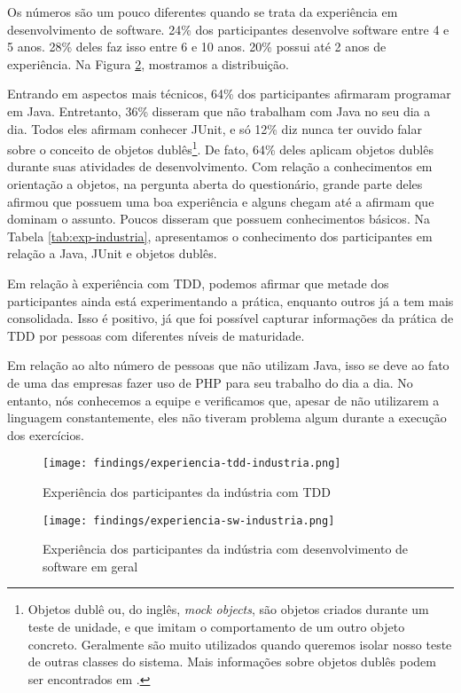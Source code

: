 Os números são um pouco diferentes quando se trata da experiência em desenvolvimento
de software. 24\% dos participantes desenvolve software entre 4 e 5 anos.
28\% deles faz isso entre 6 e 10 anos. 20\% possui até 2 anos de experiência.
Na Figura \ref{fig:exp-sw-industria}, mostramos a distribuição.

Entrando em aspectos mais técnicos, 64\% dos participantes afirmaram programar em Java. Entretanto,
36\% disseram que não trabalham com Java no seu dia a dia. Todos eles afirmam conhecer JUnit,
e só 12\% diz nunca ter ouvido falar sobre o conceito de objetos dublês\footnote{Objetos dublê ou, do inglês, 
\textit{mock objects}, são objetos criados durante um teste de unidade, e que imitam o comportamento de um
outro objeto concreto. Geralmente são muito utilizados quando queremos isolar nosso teste de outras classes
do sistema. Mais informações sobre objetos dublês podem ser encontrados em \cite{mocks}.}. De fato, 64\% deles
aplicam objetos dublês durante suas atividades de desenvolvimento. Com relação a conhecimentos
em orientação a objetos, na pergunta aberta do questionário, grande parte deles 
afirmou que possuem uma boa experiência e alguns
chegam até a afirmam que dominam o assunto. Poucos disseram que possuem conhecimentos
básicos. Na Tabela \ref{tab:exp-industria},
apresentamos o conhecimento dos participantes em relação a Java, JUnit e objetos dublês.

Em relação à experiência com TDD,
podemos afirmar que metade dos participantes ainda está experimentando a prática, enquanto
outros já a tem mais consolidada. Isso é positivo, já que foi possível capturar informações
da prática de TDD por pessoas com diferentes níveis de maturidade.

Em relação ao alto número de pessoas que não utilizam Java, isso se deve ao fato de uma das
empresas fazer uso de PHP para seu trabalho do dia a dia. No entanto, nós conhecemos a equipe
e verificamos que, apesar de não utilizarem a linguagem constantemente, eles não tiveram
problema algum durante a execução dos exercícios.

\begin{figure}[h!]
  \centering
  \texttt{[image: findings/experiencia-tdd-industria.png]}
  \caption{Experiência dos participantes da indústria com TDD}
  \label{fig:exp-tdd-industria}
\end{figure}

\begin{figure}[h!]
  \centering
  \texttt{[image: findings/experiencia-sw-industria.png]}
  \caption{Experiência dos participantes da indústria com desenvolvimento de software em geral}
  \label{fig:exp-sw-industria}
\end{figure}


